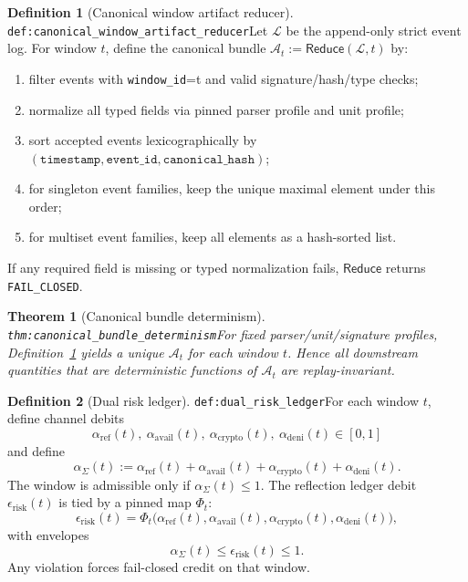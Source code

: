 \documentclass[11pt]{article}
\theoremstyle{definition}
\newtheorem{definition}{Definition}
\theoremstyle{plain}
\newtheorem{theorem}{Theorem}
\newcommand{\lbl}[1]{\texttt{\footnotesize\nolinkurl{#1}}}
\newcommand{\DefLabel}[1]{\hfill{\small\lbl{#1}}}
\newcommand{\erisk}{\epsilon_{\mathrm{risk}}}
\begin{document}
\begin{definition}[Canonical window artifact reducer]\DefLabel{def:canonical_window_artifact_reducer}\label{def:canonical_window_artifact_reducer}
Let $\mathcal{L}$ be the append-only strict event log.
For window $t$, define the canonical bundle $\mathcal{A}_t:=\mathsf{Reduce}(\mathcal{L},t)$ by:
\begin{enumerate}
\item filter events with \texttt{window\_id}=t and valid signature/hash/type checks;
\item normalize all typed fields via pinned parser profile and unit profile;
\item sort accepted events lexicographically by $(\texttt{timestamp},\texttt{event\_id},\texttt{canonical\_hash})$;
\item for singleton event families, keep the unique maximal element under this order;
\item for multiset event families, keep all elements as a hash-sorted list.
\end{enumerate}
If any required field is missing or typed normalization fails, $\mathsf{Reduce}$ returns \texttt{FAIL\_CLOSED}.
\end{definition}

\begin{theorem}[Canonical bundle determinism]\DefLabel{thm:canonical_bundle_determinism}\label{thm:canonical_bundle_determinism}
For fixed parser/unit/signature profiles, Definition~\ref{def:canonical_window_artifact_reducer} yields a unique $\mathcal{A}_t$ for each window $t$.
Hence all downstream quantities that are deterministic functions of $\mathcal{A}_t$ are replay-invariant.
\end{theorem}

\begin{definition}[Dual risk ledger]\DefLabel{def:dual_risk_ledger}\label{def:dual_risk_ledger}
For each window $t$, define channel debits
\[
\alpha_{\mathrm{ref}}(t),\ \alpha_{\mathrm{avail}}(t),\ \alpha_{\mathrm{crypto}}(t),\ \alpha_{\mathrm{deni}}(t)\in[0,1]
\]
and define
\[
\alpha_{\Sigma}(t):=\alpha_{\mathrm{ref}}(t)+\alpha_{\mathrm{avail}}(t)+\alpha_{\mathrm{crypto}}(t)+\alpha_{\mathrm{deni}}(t).
\]
The window is admissible only if $\alpha_{\Sigma}(t)\le 1$.
The reflection ledger debit $\erisk(t)$ is tied by a pinned map $\Phi_t$:
\[
\erisk(t)=\Phi_t\!\big(\alpha_{\mathrm{ref}}(t),\alpha_{\mathrm{avail}}(t),\alpha_{\mathrm{crypto}}(t),\alpha_{\mathrm{deni}}(t)\big),
\]
with envelopes
\[
\alpha_{\Sigma}(t)\le \erisk(t)\le 1.
\]
Any violation forces fail-closed credit on that window.
\end{definition}
\end{document}
